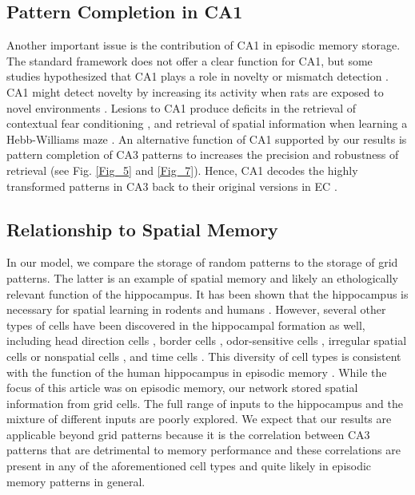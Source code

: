 \documentclass[utf8]{frontiersSCNS} %
\begin{document}
\subsection{Pattern Completion in CA1}
Another important issue is the contribution of CA1 in episodic memory storage. The standard framework does not offer a clear function for CA1, but some studies hypothesized that CA1 plays a role in novelty or mismatch detection \cite{hasselmo1996encoding, lisman2001storage}. CA1 might detect novelty by increasing its activity when rats are exposed to novel environments \cite{karlsson2008network, csicsvari2007place}.
%
Lesions to CA1 produce deficits in the retrieval of contextual fear conditioning \cite{lee2004differential}, and retrieval of spatial information when learning a Hebb-Williams maze \cite{jerman2006disconnection, vago2007role, hunsaker2008double}. 
%
An alternative function of CA1 supported by our results is pattern completion of CA3 patterns to increases the precision and robustness of retrieval (see Fig. \ref{Fig_5} and \ref{Fig_7}). Hence, CA1 decodes the highly transformed patterns in CA3 back to their original versions in EC \cite{neher2015memory}.


\subsection{Relationship to Spatial Memory}
In our model, we compare the storage of random patterns to the storage of grid patterns. The latter is an example of spatial memory and likely an ethologically relevant function of the hippocampus. It has been shown that the  hippocampus is necessary for spatial learning in rodents \cite{morris1982place} and humans \cite{burgess2002human}.  However, several other types of cells have been discovered in the hippocampal formation as well, including head direction cells \cite{taube1990head}, border cells \cite{solstad2008representation}, odor-sensitive cells \cite{deshmukh2003representation}, irregular spatial cells or nonspatial cells \cite{zhang2013optogenetic}, and time cells \cite{macdonald2011hippocampal, salz2016time}. This diversity of cell types is consistent with the function of the human hippocampus in episodic memory \cite{burgess2002human}. While the focus of this article was on episodic memory, our network stored spatial information from grid cells. The full range of inputs to the hippocampus and the mixture of different inputs are poorly explored. We expect that our results are applicable beyond grid patterns because it is the correlation between CA3 patterns that are detrimental to memory performance and these correlations are present in any of the aforementioned cell types and quite likely in episodic memory patterns in general.
\end{document}
